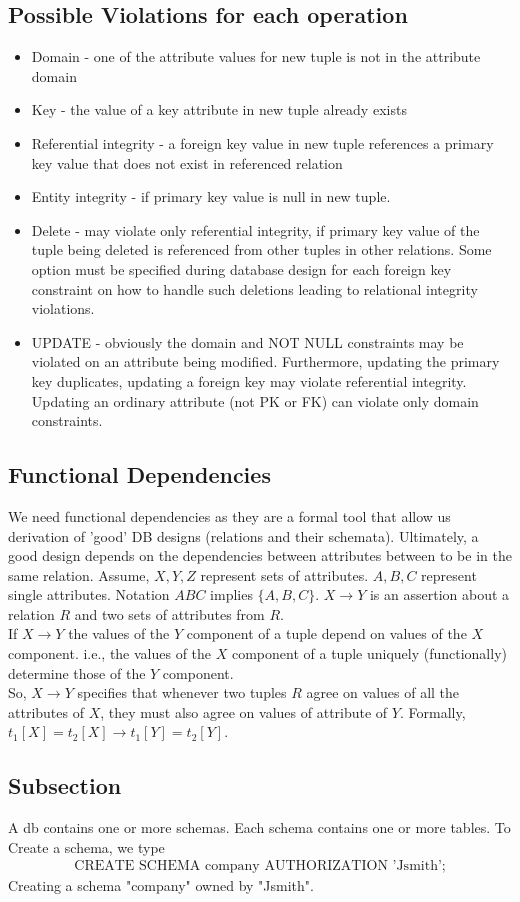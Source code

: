 \documentclass[a4paper]{article}
\theoremstyle{plain}
\theoremstyle{definition}
\theoremstyle{remark}
\begin{document}
	\subsection{Possible Violations for each operation}
	\begin{itemize}
		\item Domain - one of the attribute values for new tuple is not in the attribute domain
		\item Key - the value of a key attribute in new tuple already exists
		\item Referential integrity - a foreign key value in new tuple references a primary key value that does not exist in referenced relation
		\item Entity integrity - if primary key value is null in new tuple.
		\item Delete - may violate only referential integrity, if primary key value of the tuple being deleted is referenced from other tuples in other relations. Some option must be specified during database design for each foreign key constraint on how to handle such deletions leading to relational integrity violations.
		\item UPDATE - obviously the domain and NOT NULL constraints may be violated on an attribute being modified. Furthermore, updating the primary key duplicates, updating a foreign key may violate referential integrity. Updating an ordinary attribute (not PK or FK) can violate only domain constraints.
	\end{itemize}
	\subsection{Functional Dependencies}
	We need functional dependencies as they are a formal tool that allow us derivation of 'good' DB designs (relations and their schemata). Ultimately, a good design depends on the dependencies between attributes between to be in the same relation. Assume, $X,Y,Z$ represent sets of attributes. $A,B,C$ represent single attributes. Notation $ABC$ implies $\{A,B,C\}$. $X\to Y$ is an assertion about a relation $R$ and two sets of attributes from $R$. \\
	If $X\to Y$ the values of the $Y$ component of a tuple depend on values of the $X$ component. i.e., the values of the $X$ component of a tuple uniquely (functionally) determine those of the $Y$ component.  \\
	So, $X \to Y$ specifies that whenever two tuples $R$ agree on values of all the attributes of $X$, they must also agree on values of attribute of $Y$. Formally, $t_1[X] = t_2[X] \to t_1[Y] = t_2[Y]$. 
	\subsection{Subsection}
	A db contains one or more schemas. Each schema contains one or more tables. To Create a schema, we type
	\begin{align*}
		\text{CREATE SCHEMA company AUTHORIZATION 'Jsmith';}
	\end{align*}
	Creating a schema "company" owned by "Jsmith".
\end{document}
